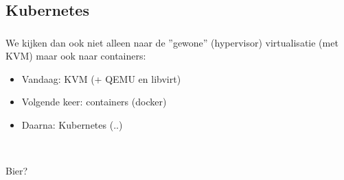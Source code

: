 \subsection {Kubernetes}
\begin{styleframe}
    \frametitle{}
We kijken dan ook niet alleen naar de ''gewone'' (hypervisor) virtualisatie (met KVM) maar ook naar containers:
\pause
\begin{itemize}
    \item Vandaag: KVM (+ QEMU en libvirt)
    \pause
    \item Volgende keer: containers (docker)
    \pause
    \item Daarna: Kubernetes (..)
    \pause
\end{itemize}
~\\
\begin{center}
\hspace{-20pt} \Huge Bier?
\end{center}
\end{styleframe}

